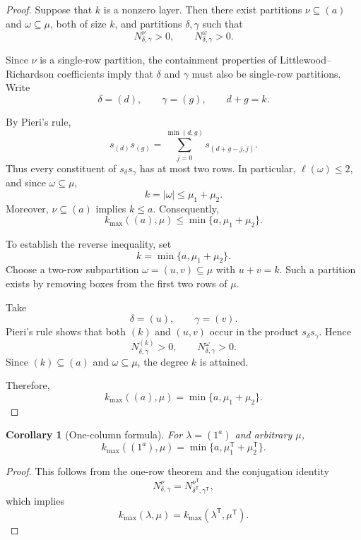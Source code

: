 \documentclass[a4paper,12pt]{article}
\theoremstyle{plain}
\newtheorem{corollary}[theorem]{Corollary}
\theoremstyle{remark}
\begin{document}
\begin{proof}
Suppose that $k$ is a nonzero layer. Then there
exist partitions $\nu\subseteq(a)$ and
$\omega\subseteq\mu$, both of size $k$, and
partitions $\delta,\gamma$ such that
\[
N_{\delta,\gamma}^{\nu}>0,
\qquad
N_{\delta,\gamma}^{\omega}>0.
\]

Since $\nu$ is a single-row partition, the containment
properties of Littlewood--Richardson coefficients
imply that $\delta$ and $\gamma$ must also be
single-row partitions. Write
\[
\delta=(d),\qquad \gamma=(g),
\qquad d+g=k.
\]

By Pieri's rule,
\[
s_{(d)}s_{(g)}
=
\sum_{j=0}^{\min(d,g)}
s_{(d+g-j,j)}.
\]
Thus every constituent of $s_\delta s_\gamma$
has at most two rows. In particular,
$\ell(\omega)\leq 2$, and since $\omega\subseteq\mu$,
\[
k=|\omega|\leq\mu_1+\mu_2.
\]
Moreover, $\nu\subseteq(a)$ implies $k\leq a$.
Consequently,
\[
k_{\max}((a),\mu)
\leq \min\{a,\mu_1+\mu_2\}.
\]

To establish the reverse inequality, set
\[
k=\min\{a,\mu_1+\mu_2\}.
\]
Choose a two-row subpartition
$\omega=(u,v)\subseteq\mu$ with $u+v=k$.
Such a partition exists by removing boxes from
the first two rows of $\mu$.

Take
\[
\delta=(u),\qquad \gamma=(v).
\]
Pieri's rule shows that both $(k)$ and $(u,v)$
occur in the product $s_\delta s_\gamma$.
Hence
\[
N_{\delta,\gamma}^{(k)}>0,
\qquad
N_{\delta,\gamma}^{\omega}>0.
\]
Since $(k)\subseteq(a)$ and $\omega\subseteq\mu$,
the degree $k$ is attained.

Therefore,
\[
k_{\max}((a),\mu)
=
\min\{a,\mu_1+\mu_2\}.
\]
\end{proof}

\begin{corollary}[One-column formula]
For $\lambda=(1^a)$ and arbitrary $\mu$,
\[
\boxed{
k_{\max}((1^a),\mu)
=
\min\{a,\mu_1^{\mathsf T}+\mu_2^{\mathsf T}\}.
}
\]
\end{corollary}

\begin{proof}
This follows from the one-row theorem and the
conjugation identity
\[
N_{\delta,\gamma}^{\nu}
=
N_{\delta^{\mathsf T},\gamma^{\mathsf T}}
 ^{\nu^{\mathsf T}},
\]
which implies
\[
k_{\max}(\lambda,\mu)
=
k_{\max}(\lambda^{\mathsf T},\mu^{\mathsf T}).
\]
\end{proof}
\end{document}
